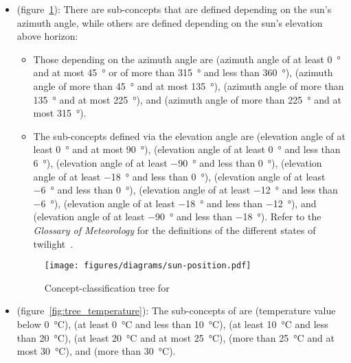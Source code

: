 \begin{itemize}
  \item {} (figure~\ref{fig:tree_sun_position}): There are sub-concepts that are defined depending on the sun's azimuth angle, while others are defined depending on the sun's elevation above horizon:
    \begin{itemize}
      \item Those depending on the azimuth angle are  (azimuth angle of at least \SI{0}{\degree} and at most \SI{45}{\degree} or of more than \SI{315}{\degree} and less than \SI{360}{\degree}),  (azimuth angle of more than \SI{45}{\degree} and at most \SI{135}{\degree}),  (azimuth angle of more than \SI{135}{\degree} and at most \SI{225}{\degree}), and  (azimuth angle of more than \SI{225}{\degree} and at most \SI{315}{\degree}).
      
      \item The sub-concepts defined via the elevation angle are  (elevation angle of at least \SI{0}{\degree} and at most \SI{90}{\degree}),  (elevation angle of at least \SI{0}{\degree} and less than \SI{6}{\degree}),  (elevation angle of at least \SI{-90}{\degree} and less than \SI{0}{\degree}),  (elevation angle of at least \SI{-18}{\degree} and less than \SI{0}{\degree}),  (elevation angle of at least \SI{-6}{\degree} and less than \SI{0}{\degree}),  (elevation angle of at least \SI{-12}{\degree} and less than \SI{-6}{\degree}),  (elevation angle of at least \SI{-18}{\degree} and less than \SI{-12}{\degree}), and  (elevation angle of at least \SI{-90}{\degree} and less than \SI{-18}{\degree}). Refer to the \emph{Glossary of Meteorology} for the definitions of the different states of twilight~\cite{GlossaryOfMeteorology}.
    \end{itemize}
  
  \begin{figure}
    \centering
    \texttt{[image: figures/diagrams/sun-position.pdf]}
    \caption{Concept-classification tree for }
    \label{fig:tree_sun_position}
  \end{figure}

  \item {} (figure~\ref{fig:tree_temperature}): The sub-concepts of  are  (temperature value below \SI{0}{\celsius}),  (at least \SI{0}{\celsius} and less than \SI{10}{\celsius}),  (at least \SI{10}{\celsius} and less than \SI{20}{\celsius}),  (at least \SI{20}{\celsius} and at most \SI{25}{\celsius}),  (more than \SI{25}{\celsius} and at most \SI{30}{\celsius}), and  (more than \SI{30}{\celsius}).
  

\end{itemize}
